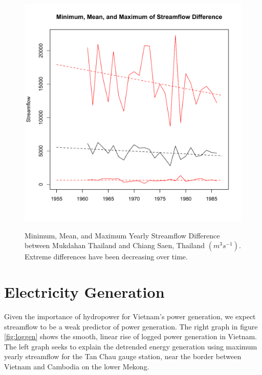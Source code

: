 \documentclass[11pt,english]{article}
\theoremstyle{plain} \newtheorem{claim}{Claim}
\theoremstyle{plain} \newtheorem{prop}{Proposition}
\theoremstyle{plain} \newtheorem{hypo}{Hypothesis}
\begin{document}
\begin{figure}
\includegraphics{displays/difference-year.pdf}
\label{diff}
\caption{Minimum, Mean, and Maximum Yearly Streamflow Difference between Mukdahan Thailand and Chiang Saen, Thailand $(m^3 s^{-1})$.  Extreme differences have been decreasing over time.}
\end{figure}

\section{Electricity Generation}

Given the importance of hydropower for Vietnam's power generation, we expect streamflow to be a weak predictor of power generation.  The right graph in figure \ref{fig:loggen} shows the smooth, linear rise of logged power generation in Vietnam.  The left graph seeks to explain the detrended energy generation using maximum yearly streamflow for the Tan Chau gauge station, near the border between Vietnam and Cambodia on the lower Mekong.
\end{document}
